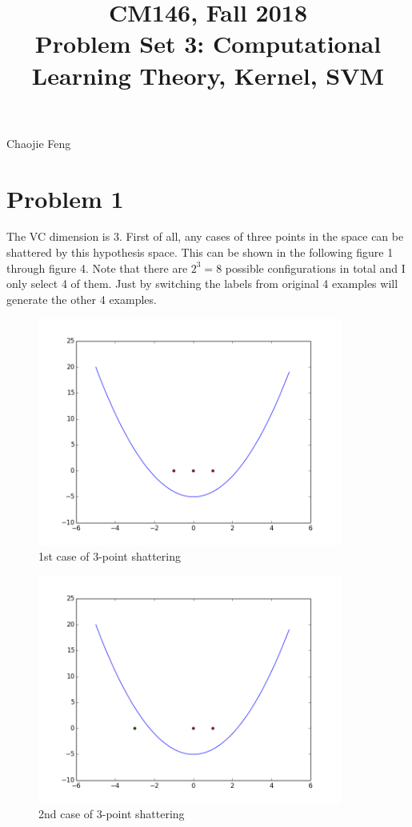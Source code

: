 \documentclass[11pt]{article}
\newcommand{\cnum}{CM146}
\newcommand{\ced}{Fall 2018}
\newcommand{\ctitle}[3]{\title{\vspace{-0.5in}\cnum, \ced\\Problem Set #1: #2}}
\newcommand{\solution}[1]{{{\color{black}{\bf Solution:} {#1}}}}
\begin{document}
\ctitle{3}{Computational Learning Theory, Kernel, SVM}
\author{Chaojie Feng}
\date{}
\maketitle
\vspace{-0.75in}

\section{Problem 1}

\solution{
The VC dimension is 3.
First of all, any cases of three points in the space can be shattered by this hypothesis space. This can be shown in the following figure 1 through figure 4. Note that there are $2^3 = 8$ possible configurations in total and I only select 4 of them. Just by switching the labels from original 4 examples will generate the other 4 examples.
	
	\begin{figure}[h!]
	\centering
	\includegraphics[width = 10cm]{1a}
	\caption{1st case of 3-point shattering}
	\end{figure}
	
	\begin{figure}[h!]
	\centering
	\includegraphics[width = 10cm]{1b}
	\caption{2nd case of 3-point shattering}
	\end{figure}
	
}
\end{document}

